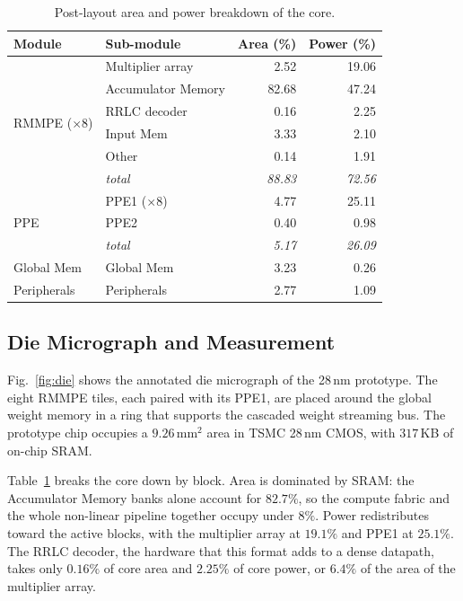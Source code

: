 \documentclass[lettersize,journal]{IEEEtran}
\begin{document}
\begin{table}[!t]
    \caption{Post-layout area and power breakdown of the core.}
    \label{tab:breakdown}
    \centering
    \footnotesize
    \setlength{\tabcolsep}{3pt}
    \begin{tabular*}{\columnwidth}{@{}ll@{\extracolsep{\fill}}rr@{}}
        \toprule
        Module & Sub-module & Area (\%) & Power (\%) \\
        \midrule
        \multirow{6}{*}{RMMPE ($\times$8)}
            & Multiplier array   & 2.52  & 19.06 \\
            & Accumulator Memory & 82.68 & 47.24 \\
            & RRLC decoder       & 0.16  & 2.25  \\
            & Input Mem          & 3.33  & 2.10  \\
            & Other              & 0.14  & 1.91  \\
            & \textit{total}     & \textit{88.83} & \textit{72.56} \\
        \midrule
        \multirow{3}{*}{PPE}
            & PPE1 ($\times$8)   & 4.77  & 25.11 \\
            & PPE2               & 0.40  & 0.98  \\
            & \textit{total}     & \textit{5.17}  & \textit{26.09} \\
        \midrule
        Global Mem  & Global Mem  & 3.23 & 0.26 \\
        Peripherals & Peripherals & 2.77 & 1.09 \\
        \bottomrule
    \end{tabular*}
    \vspace{-3pt}
\end{table}


\subsection{Die Micrograph and Measurement}
\label{sec:results-die}





Fig.~\ref{fig:die} shows the annotated die micrograph of the 28\,nm prototype. The eight RMMPE tiles, each paired with its PPE1, are placed around the global weight memory in a ring that supports the cascaded weight streaming bus. The prototype chip occupies a $9.26$\,mm$^{2}$ area in TSMC 28\,nm CMOS, with $317$\,KB of on-chip SRAM.

Table~\ref{tab:breakdown} breaks the core down by block. Area is dominated by SRAM: the Accumulator Memory banks alone account for $82.7\%$, so the compute fabric and the whole non-linear pipeline together occupy under $8\%$. Power redistributes toward the active blocks, with the multiplier array at $19.1\%$ and PPE1 at $25.1\%$. The RRLC decoder, the hardware that this format adds to a dense datapath, takes only $0.16\%$ of core area and $2.25\%$ of core power, or $6.4\%$ of the area of the multiplier array.
\end{document}
